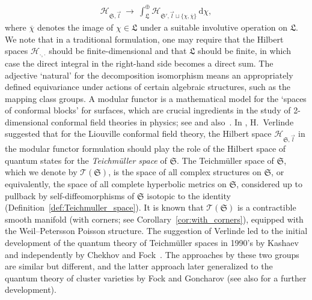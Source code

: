 \documentclass[10pt,a4paper]{amsart}
\numberwithin{equation}{section}
\theoremstyle{definition}
\newcommand{\ol}[1]{\overline{#1}}
\begin{document}
\begin{align}
\label{eq:intro_decomposition}
\mathscr{H}_{\mathfrak{S},\vec{l}} \ \to \ \int_{\mathfrak{L}}^\oplus \mathscr{H}_{\mathfrak{S}',\vec{l} \sqcup\{\chi, \ol{\chi}\}} \, \mathrm{d}\chi,
\end{align}
where $\ol{\chi}$ denotes the image of $\chi \in \mathfrak{L}$ under a suitable involutive operation on $\mathfrak{L}$. We note that in a traditional formulation, one may require that the Hilbert spaces $\mathscr{H}_{\cdot,\cdot}$ should be finite-dimensional and that $\mathfrak{L}$ should be finite, in which case the direct integral in the right-hand side becomes a direct sum. The adjective `natural' for the decomposition isomorphism means an appropriately defined equivariance under actions of certain algebraic structures, such as the mapping class groups.
A modular functor is a mathematical model for the `spaces of conformal blocks' for surfaces, which are crucial ingredients in the study of 2-dimensional conformal field theories in physics; see \cite{BK, MS, Segal} and also~\cite{T}. In \cite{Verlinde}, H.~Verlinde suggested that for the Liouville conformal field theory, the Hilbert space $\mathscr{H}_{\mathfrak{S},\vec{l}}$ in the modular functor formulation should play the role of the Hilbert space of quantum states for the {\it Teichm\"uller space} of $\mathfrak{S}$. The Teichm\"uller space of $\mathfrak{S}$, which we denote by $\mathscr{T}(\mathfrak{S})$, is the space of all complex structures on $\mathfrak{S}$, or equivalently, the space of all complete hyperbolic metrics on $\mathfrak{S}$, considered up to pullback by self-diffeomorphisms of $\mathfrak{S}$ isotopic to the identity (Definition~\ref{def:Teichmuller_space}). It is known that $\mathscr{T}(\mathfrak{S})$ is a contractible smooth manifold (with corners; see Corollary~\ref{cor:with_corners}), equipped with the Weil--Petersson Poisson structure. The suggestion of Verlinde led to the initial development of the quantum theory of Teichm\"uller spaces in 1990's by Kashaev \cite{Kash98} and independently by Chekhov and Fock~\cite{F97, CF}. The approaches by these two groups are similar but different, and the latter approach later generalized to the quantum theory of cluster varieties by Fock and Goncharov \cite{FG09} (see also \cite{JLSS} for a further development).
\end{document}
